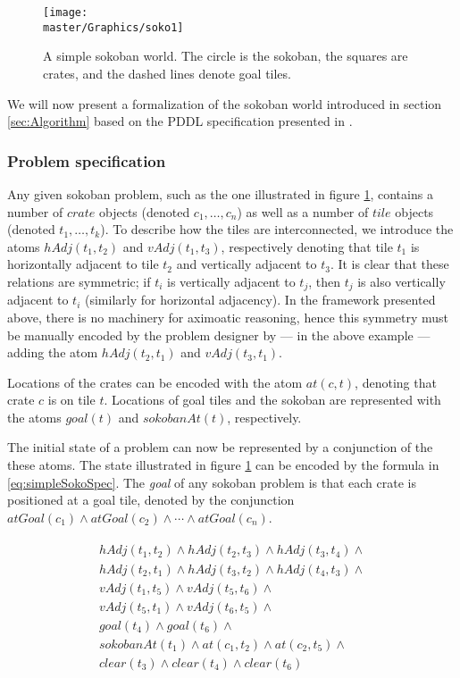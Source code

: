 \documentclass[../Master.tex]{subfiles}
\begin{document}
\begin{figure}
    \centering
    \texttt{[image: \\master/Graphics/soko1]}
    \caption{\label{fig:simpleSokoban} A simple sokoban world. The circle is the sokoban, the squares are crates, and the dashed lines denote goal tiles.}
\end{figure}

We will now present a formalization of the sokoban world introduced in section \ref{sec:Algorithm} based on the PDDL specification presented in \cite{BS2011}.

\subsubsection*{Problem specification}
Any given sokoban problem, such as the one illustrated in figure \ref{fig:simpleSokoban}, contains a number of $crate$ objects (denoted $c_1, \dots, c_n$) as well as a number of $tile$ objects (denoted $t_1, \dots, t_k$). To describe how the tiles are interconnected, we introduce the atoms $hAdj(t_1,t_2)$ and $vAdj(t_1,t_3)$, respectively denoting that tile $t_1$ is horizontally adjacent to tile $t_2$ and vertically adjacent to $t_3$. It is clear that these relations are symmetric; if $t_i$ is vertically adjacent to $t_j$, then $t_j$ is also vertically adjacent to $t_i$ (similarly for horizontal adjacency). In the framework presented above, there is no machinery for aximoatic reasoning, hence this symmetry must be manually encoded by the problem designer by --- in the above example --- adding the atom $hAdj(t_2,t_1)$ and $vAdj(t_3,t_1)$.

Locations of the crates can be encoded with the atom $at(c, t)$, denoting that crate $c$ is on tile $t$. Locations of goal tiles and the sokoban are represented with the atoms $goal(t)$ and $sokobanAt(t)$, respectively.

The initial state of a problem can now be represented by a conjunction of the these atoms. The state illustrated in figure \ref{fig:simpleSokoban} can be encoded by the formula in \eqref{eq:simpleSokoSpec}. The \textit{goal} of any sokoban problem is that each crate is positioned at a goal tile, denoted by the conjunction $atGoal(c_1) \land atGoal(c_2) \land \cdots \land atGoal(c_n)$.

\begin{gather}
\begin{gathered} \label{eq:simpleSokoSpec}
    hAdj(t_1, t_2) \land hAdj(t_2, t_3) \land hAdj(t_3, t_4) \land \\
    hAdj(t_2, t_1) \land hAdj(t_3, t_2) \land hAdj(t_4, t_3) \land \\
    vAdj(t_1, t_5) \land vAdj(t_5, t_6) \land \\
    vAdj(t_5, t_1) \land vAdj(t_6, t_5) \land \\
    goal(t_4) \land goal(t_6) \land \\
    sokobanAt(t_1) \land at(c_1, t_2) \land at(c_2, t_5) \land \\
    clear(t_3) \land clear(t_4) \land clear(t_6)
\end{gathered}
\end{gather}
\end{document}
